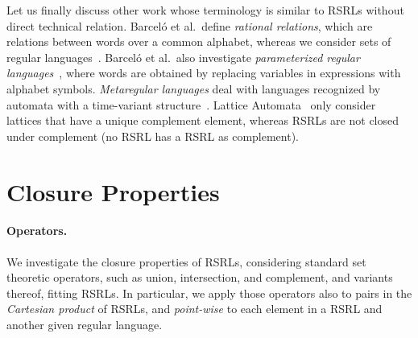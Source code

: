\documentclass[envcountsame]{llncs}
\newcommand{\RegularlyGeneratedLanguageSetAbbrev}{RSRL\xspace}
\newcommand{\RegularlyGeneratedLanguageSetsAbbrev}{RSRLs\xspace}
\begin{document}
Let us finally discuss other work whose terminology is similar to \RegularlyGeneratedLanguageSetsAbbrev without
direct technical relation. Barcel{\'o} et al.~define \emph{rational relations}, which are
relations between words over a common alphabet, whereas we consider
sets of regular languages~\cite{DBLP:conf/lics/BarceloFL12}.
Barcel{\'o} et al.~also investigate \emph{parameterized regular
  languages}~\cite{DBLP:journals/tcs/BarceloRL13}, where words are
obtained by replacing variables in expressions with alphabet symbols.
\emph{Metaregular languages} deal with languages recognized by
automata with a time-variant
structure~\cite{1967Agasandyan,Salomaa196885}.
Lattice Automata~\cite{lattice-automata} only consider lattices that
have a unique complement element, whereas
\RegularlyGeneratedLanguageSetsAbbrev are not closed under complement
(no \RegularlyGeneratedLanguageSetAbbrev has a
\RegularlyGeneratedLanguageSetAbbrev as complement).
 \section{Closure Properties}
\label{sec:closure-properties}

\paragraph*{Operators.}
\label{sec:operators}
We investigate the closure properties of \RegularlyGeneratedLanguageSetsAbbrev, considering
standard set theoretic operators, such as union, intersection, and
complement, and variants thereof, fitting \RegularlyGeneratedLanguageSetsAbbrev. 
In particular, we apply those operators also to pairs in the
\emph{Cartesian product} of \RegularlyGeneratedLanguageSetsAbbrev, and \emph{point-wise} to
each element in a \RegularlyGeneratedLanguageSetAbbrev and another given regular language.
\end{document}
